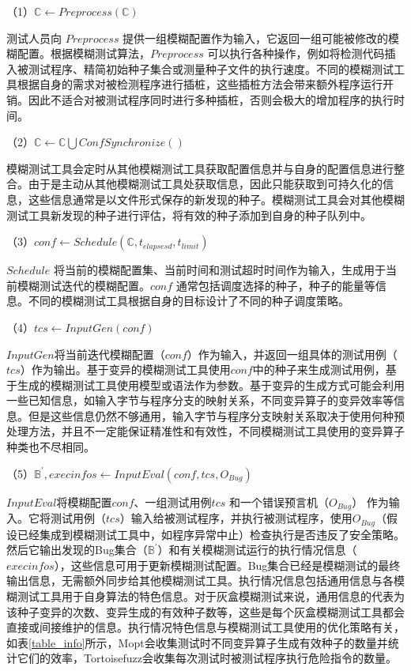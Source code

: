 \documentclass[master]{thesis-uestc}
\begin{document}
（1）$\mathbb{C} \leftarrow Preprocess(\mathbb{C})$

测试人员向 $Preprocess$ 提供一组模糊配置作为输入，它返回一组可能被修改的模糊配置。根据模糊测试算法，$Preprocess$ 可以执行各种操作，例如将检测代码插入被测试程序、精简初始种子集合或测量种子文件的执行速度。不同的模糊测试工具根据自身的需求对被检测程序进行插桩，这些插桩方法会带来额外程序运行开销。因此不适合对被测试程序同时进行多种插桩，否则会极大的增加程序的执行时间。

（2）$\mathbb{C} \leftarrow \mathbb{C} \bigcup ConfSynchronize()$

模糊测试工具会定时从其他模糊测试工具获取配置信息并与自身的配置信息进行整合。由于是主动从其他模糊测试工具处获取信息，因此只能获取到可持久化的信息，这些信息通常是以文件形式保存的新发现的种子。模糊测试工具会对其他模糊测试工具新发现的种子进行评估，将有效的种子添加到自身的种子队列中。

（3）$conf \leftarrow Schedule(\mathbb{C}, t_{elapsesd}, t_{limit})$

$Schedule$ 将当前的模糊配置集、当前时间和测试超时时间作为输入，生成用于当前模糊测试迭代的模糊配置。$conf$ 通常包括调度选择的种子，种子的能量等信息。不同的模糊测试工具根据自身的目标设计了不同的种子调度策略。

（4）$tcs \leftarrow InputGen(conf)$

$InputGen$将当前迭代模糊配置（$conf$）作为输入，并返回一组具体的测试用例（$tcs$）作为输出。基于变异的模糊测试工具使用$conf$中的种子来生成测试用例，基于生成的模糊测试工具使用模型或语法作为参数。基于变异的生成方式可能会利用一些已知信息，如输入字节与程序分支的映射关系，不同变异算子的变异效率等信息。但是这些信息仍然不够通用，输入字节与程序分支映射关系取决于使用何种预处理方法，并且不一定能保证精准性和有效性，不同模糊测试工具使用的变异算子种类也不尽相同。

（5）$\mathbb{B}^\prime, execinfos \leftarrow InputEval(conf, tcs, O_{Bug})$

$InputEval$将模糊配置$conf$、一组测试用例$tcs$ 和一个错误预言机（$O_{Bug}$） 作为输入。它将测试用例（$tcs$）输入给被测试程序，并执行被测试程序，使用$O_{Bug}$（假设已经集成到模糊测试工具中，如程序异常中止）检查执行是否违反了安全策略。然后它输出发现的Bug集合（$\mathbb{B}^\prime$）和有关模糊测试运行的执行情况信息（$execinfos$），这些信息可用于更新模糊测试配置。Bug集合已经是模糊测试的最终输出信息，无需额外同步给其他模糊测试工具。执行情况信息包括通用信息与各模糊测试工具用于自身算法的特色信息。对于灰盒模糊测试来说，通用信息的代表为该种子变异的次数、变异生成的有效种子数等，这些是每个灰盒模糊测试工具都会直接或间接维护的信息。执行情况特色信息与模糊测试工具使用的优化策略有关，如表\ref{table_info}所示，Mopt会收集测试时不同变异算子生成有效种子的数量并统计它们的效率，Tortoisefuzz会收集每次测试时被测试程序执行危险指令的数量。
\end{document}
